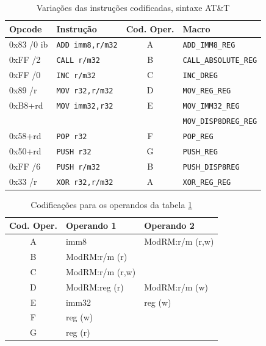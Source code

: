 \begin{table}[ht!]
  \caption{Variações das instruções codificadas, sintaxe AT\&T\label{instr-encoding}}
  \centering
  \begin{tabular}{l l c l}
    \toprule
    Opcode  & Instrução     & Cod. Oper.    & Macro \\
    \midrule

    0x83 /0 ib & \verb!ADD imm8,r/m32! & A  & \verb!ADD_IMM8_REG! \\

    0xFF /2 & \verb!CALL r/m32! & B & \verb!CALL_ABSOLUTE_REG! \\

    0xFF /0 & \verb!INC r/m32! & C & \verb!INC_DREG! \\

    0x89 /r & \verb!MOV r32,r/m32!& D & \verb!MOV_REG_REG! \\
    \hline
    0xB8+rd & \verb!MOV imm32,r32! & E & \verb!MOV_IMM32_REG! \\
    & & & \verb!MOV_DISP8DREG_REG! \\
    \hline

    0x58+rd & \verb!POP r32!     & F & \verb!POP_REG!\\

    0x50+rd & \verb!PUSH r32!    & G & \verb!PUSH_REG!\\
    0xFF /6 & \verb!PUSH r/m32!  & B & \verb!PUSH_DISP8REG!\\

    0x33 /r & \verb!XOR r32,r/m32!& A & \verb!XOR_REG_REG! \\

    \bottomrule
  \end{tabular}
\end{table}

\begin{table}[ht!]
  \caption{Codificações para os operandos da tabela \ref{instr-encoding}\label{op-encoding}}
  \centering
  \begin{tabular}{c l l}
    \toprule
    Cod. Oper. & Operando 1 & Operando 2 \\
    \midrule
    A & imm8 & ModRM:r/m (r,w) \\
    B & ModRM:r/m (r) & \\
    C & ModRM:r/m (r,w) & \\
    D & ModRM:reg (r)& ModRM:r/m (w) \\
    E & imm32 & reg (w) \\
    F & reg (w) & \\
    G & reg (r) & \\
    \bottomrule
  \end{tabular}
\end{table}
